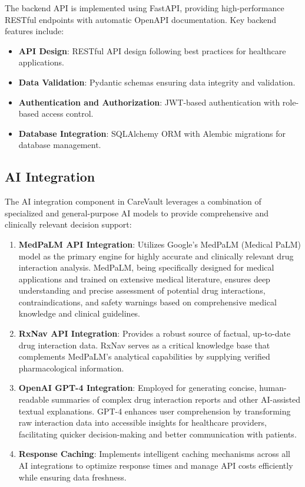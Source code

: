 \documentclass[12pt,a4paper]{article}
\begin{document}
The backend API is implemented using FastAPI, providing high-performance RESTful endpoints with automatic OpenAPI documentation. Key backend features include:

\begin{itemize}
    \item \textbf{API Design}: RESTful API design following best practices for healthcare applications.
    \item \textbf{Data Validation}: Pydantic schemas ensuring data integrity and validation.
    \item \textbf{Authentication and Authorization}: JWT-based authentication with role-based access control.
    \item \textbf{Database Integration}: SQLAlchemy ORM with Alembic migrations for database management.
\end{itemize}

\subsection{AI Integration}

The AI integration component in CareVault leverages a combination of specialized and general-purpose AI models to provide comprehensive and clinically relevant decision support:

\begin{enumerate}
    \item \textbf{MedPaLM API Integration}: Utilizes Google's MedPaLM (Medical PaLM) model as the primary engine for highly accurate and clinically relevant drug interaction analysis. MedPaLM, being specifically designed for medical applications and trained on extensive medical literature, ensures deep understanding and precise assessment of potential drug interactions, contraindications, and safety warnings based on comprehensive medical knowledge and clinical guidelines.
    \item \textbf{RxNav API Integration}: Provides a robust source of factual, up-to-date drug interaction data. RxNav serves as a critical knowledge base that complements MedPaLM's analytical capabilities by supplying verified pharmacological information.
    \item \textbf{OpenAI GPT-4 Integration}: Employed for generating concise, human-readable summaries of complex drug interaction reports and other AI-assisted textual explanations. GPT-4 enhances user comprehension by transforming raw interaction data into accessible insights for healthcare providers, facilitating quicker decision-making and better communication with patients.
    \item \textbf{Response Caching}: Implements intelligent caching mechanisms across all AI integrations to optimize response times and manage API costs efficiently while ensuring data freshness.
\end{enumerate}
\end{document}
